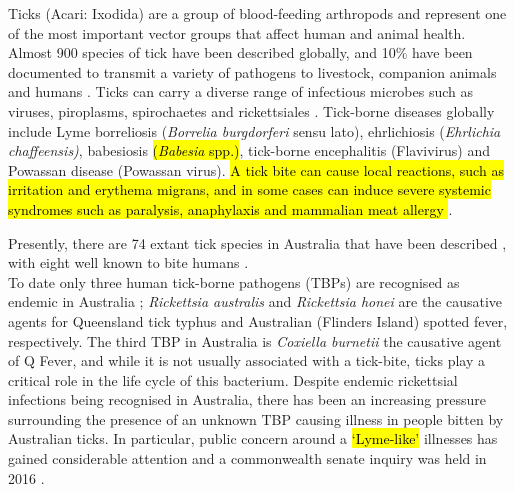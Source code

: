 \documentclass[a4paper, nobind]{templates/ociamthesis}
\begin{document}
Ticks (Acari: Ixodida) are a group of blood-feeding arthropods and represent one of the most important vector groups that affect human and animal health. Almost 900 species of tick have been described globally, and 10\% have been documented to transmit a variety of pathogens to livestock, companion animals and humans \autocite{jongejanGlobalImportanceTicks2004}.
Ticks can carry a diverse range of infectious microbes such as viruses, piroplasms, spirochaetes and rickettsiales \autocite{pfaffleEcologyTickborneDiseases2013}.
Tick-borne diseases globally include Lyme borreliosis (\emph{Borrelia burgdorferi} sensu lato), ehrlichiosis (\emph{Ehrlichia chaffeensis)}, babesiosis \hl{(\emph{Babesia} spp.)}, tick-borne encephalitis (Flavivirus) and Powassan disease (Powassan virus).
\hl{A tick bite can cause local reactions, such as irritation and erythema migrans, and in some cases can induce severe systemic syndromes such as paralysis, anaphylaxis and mammalian meat allergy \autocite{vannunenTickinducedAllergiesMammalian2015,beamanNoninfectiousIllnessTick2018,pienaarTickParalysisSolving2018}}.

Presently, there are 74 extant tick species in Australia that have been described \autocite{barkerList70Species2014,ashMorphologicalMolecularDescription2017,heathNewSpeciesTick2017,kwakIxodesHeathiSp2018,barkerIxodesBarkeriSp2019}, with eight well known to bite humans \autocite{barkerTicksAustraliaSpecies2014}.\\
To date only three human tick-borne pathogens (TBPs) are recognised as endemic in Australia \autocite{gravesTickborneInfectiousDiseases2017}; \emph{Rickettsia australis} and \emph{Rickettsia honei} are the causative agents for Queensland tick typhus and Australian (Flinders Island) spotted fever, respectively.
The third TBP in Australia is \emph{Coxiella burnetii} the causative agent of Q Fever, and while it is not usually associated with a tick-bite, ticks play a critical role in the life cycle of this bacterium.
Despite endemic rickettsial infections being recognised in Australia, there has been an increasing pressure surrounding the presence of an unknown TBP causing illness in people bitten by Australian ticks.
In particular, public concern around a \hl{`Lyme-like'} illnesses has gained considerable attention and a commonwealth senate inquiry was held in 2016 \autocite{radcliffeGrowingEvidenceEmerging2016}.
\end{document}
